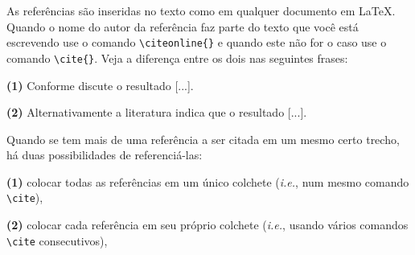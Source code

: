 As referências são inseridas no texto como em qualquer documento em \LaTeX. Quando o nome do autor da referência faz parte do texto que você está escrevendo use o comando  \verb+\citeonline{}+ e quando este não for o caso use o comando \verb+\cite{}+. Veja a diferença entre os dois nas seguintes frases:

\noindent\textbf{(1)} Conforme discute  o resultado [...].

\noindent\textbf{(2)} Alternativamente a literatura\cite{kim1996} indica que o resultado [...].

Quando se tem mais de uma referência a ser citada em um mesmo certo trecho, há duas possibilidades de referenciá-las:

\noindent\textbf{(1)} colocar todas as referências em um único colchete (\emph{i.e.}, num mesmo comando \verb+\cite+),


\cite{kim1996,Wikibooks2009}

	
\noindent\textbf{(2)} colocar cada referência em seu próprio colchete (\emph{i.e.}, usando vários comandos \verb+\cite+ consecutivos),


\cite{kim1996}\cite{Wikibooks2009}


